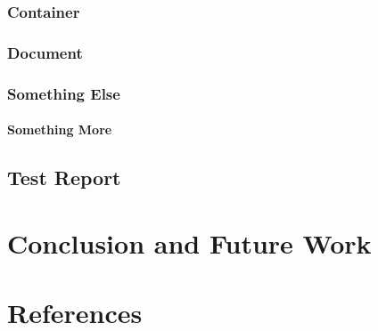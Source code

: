 \documentclass{vitmsprojectreport}
\begin{document}
\subsection{Container}

\subsection{Document}

\subsection{Something Else}

\subsubsection{Something More}

\section{Test Report}

\chapter{Conclusion and Future Work}

\chapter{References}
\end{document}
